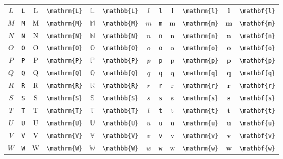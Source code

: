 \begin{table}[th]
\begin{tabular}{ c@{ }l c@{ }l c@{ }l c@{ }l c@{ }l c@{ }l}
		$L$ & \verb|L| & $\mathrm{L}$ & \verb|\mathrm{L}| & $\mathbb{L}$ & \verb|\mathbb{L}| & $l$ & \verb|l| & $\mathrm{l}$ & \verb|\mathrm{l}| & $\mathbf{l}$ & \verb|\mathbf{l}| \\
		$M$ & \verb|M| & $\mathrm{M}$ & \verb|\mathrm{M}| & $\mathbb{M}$ & \verb|\mathbb{M}| & $m$ & \verb|m| & $\mathrm{m}$ & \verb|\mathrm{m}| & $\mathbf{m}$ & \verb|\mathbf{m}| \\
		$N$ & \verb|N| & $\mathrm{N}$ & \verb|\mathrm{N}| & $\mathbb{N}$ & \verb|\mathbb{N}| & $n$ & \verb|n| & $\mathrm{n}$ & \verb|\mathrm{n}| & $\mathbf{n}$ & \verb|\mathbf{n}| \\
		$O$ & \verb|O| & $\mathrm{O}$ & \verb|\mathrm{O}| & $\mathbb{O}$ & \verb|\mathbb{O}| & $o$ & \verb|o| & $\mathrm{o}$ & \verb|\mathrm{o}| & $\mathbf{o}$ & \verb|\mathbf{o}| \\
		$P$ & \verb|P| & $\mathrm{P}$ & \verb|\mathrm{P}| & $\mathbb{P}$ & \verb|\mathbb{P}| & $p$ & \verb|p| & $\mathrm{p}$ & \verb|\mathrm{p}| & $\mathbf{p}$ & \verb|\mathbf{p}| \\
		$Q$ & \verb|Q| & $\mathrm{Q}$ & \verb|\mathrm{Q}| & $\mathbb{Q}$ & \verb|\mathbb{Q}| & $q$ & \verb|q| & $\mathrm{q}$ & \verb|\mathrm{q}| & $\mathbf{q}$ & \verb|\mathbf{q}| \\
		$R$ & \verb|R| & $\mathrm{R}$ & \verb|\mathrm{R}| & $\mathbb{R}$ & \verb|\mathbb{R}| & $r$ & \verb|r| & $\mathrm{r}$ & \verb|\mathrm{r}| & $\mathbf{r}$ & \verb|\mathbf{r}| \\
		$S$ & \verb|S| & $\mathrm{S}$ & \verb|\mathrm{S}| & $\mathbb{S}$ & \verb|\mathbb{S}| & $s$ & \verb|s| & $\mathrm{s}$ & \verb|\mathrm{s}| & $\mathbf{s}$ & \verb|\mathbf{s}| \\
		$T$ & \verb|T| & $\mathrm{T}$ & \verb|\mathrm{T}| & $\mathbb{T}$ & \verb|\mathbb{T}| & $t$ & \verb|t| & $\mathrm{t}$ & \verb|\mathrm{t}| & $\mathbf{t}$ & \verb|\mathbf{t}| \\
		$U$ & \verb|U| & $\mathrm{U}$ & \verb|\mathrm{U}| & $\mathbb{U}$ & \verb|\mathbb{U}| & $u$ & \verb|u| & $\mathrm{u}$ & \verb|\mathrm{u}| & $\mathbf{u}$ & \verb|\mathbf{u}| \\
		$V$ & \verb|V| & $\mathrm{V}$ & \verb|\mathrm{V}| & $\mathbb{V}$ & \verb|\mathbb{V}| & $v$ & \verb|v| & $\mathrm{v}$ & \verb|\mathrm{v}| & $\mathbf{v}$ & \verb|\mathbf{v}| \\
		$W$ & \verb|W| & $\mathrm{W}$ & \verb|\mathrm{W}| & $\mathbb{W}$ & \verb|\mathbb{W}| & $w$ & \verb|w| & $\mathrm{w}$ & \verb|\mathrm{w}| & $\mathbf{w}$ & \verb|\mathbf{w}| \\

\end{tabular}
\end{table}
